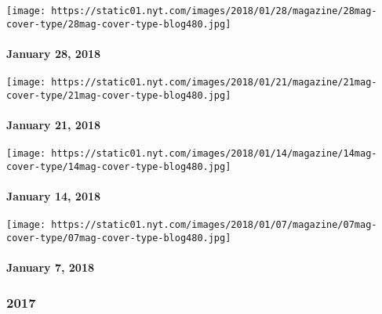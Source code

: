 \href{https://www.nytimes.com/issue/magazine/2018/02/01/12818-issue}{}

\texttt{[image: https://static01.nyt.com/images/2018/01/28/magazine/28mag-cover-type/28mag-cover-type-blog480.jpg]}

\hypertarget{january-28-2018}{%
\paragraph{January 28, 2018}\label{january-28-2018}}

\href{https://www.nytimes.com/issue/magazine/2018/01/12/12118-issue}{}

\texttt{[image: https://static01.nyt.com/images/2018/01/21/magazine/21mag-cover-type/21mag-cover-type-blog480.jpg]}

\hypertarget{january-21-2018}{%
\paragraph{January 21, 2018}\label{january-21-2018}}

\href{https://www.nytimes.com/issue/magazine/2018/01/19/11418-issue}{}

\texttt{[image: https://static01.nyt.com/images/2018/01/14/magazine/14mag-cover-type/14mag-cover-type-blog480.jpg]}

\hypertarget{january-14-2018}{%
\paragraph{January 14, 2018}\label{january-14-2018}}

\href{https://www.nytimes.com/issue/magazine/2018/01/05/10718-issue}{}

\texttt{[image: https://static01.nyt.com/images/2018/01/07/magazine/07mag-cover-type/07mag-cover-type-blog480.jpg]}

\hypertarget{january-7-2018}{%
\paragraph{January 7, 2018}\label{january-7-2018}}

\hypertarget{2017}{%
\subsubsection{2017}\label{2017}}

\href{https://www.nytimes.com/interactive/2017/12/28/magazine/the-lives-they-lived-2017.html}{}

